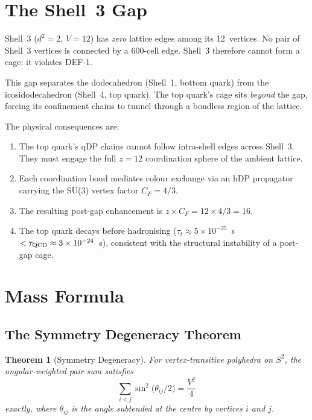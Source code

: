 \documentclass[11pt,letterpaper]{article}
\newtheorem{theorem}{Theorem}[section]
\begin{document}
\section{The Shell~3 Gap}
\label{sec:shell3}

Shell~3 ($d^2 = 2$, $V = 12$) has \emph{zero} lattice edges among
its 12~vertices.  No pair of Shell~3 vertices is connected by a
600-cell edge.  Shell~3 therefore cannot form a cage: it violates
DEF-1.

This gap separates the dodecahedron (Shell~1, bottom quark) from
the icosidodecahedron (Shell~4, top quark).  The top quark's cage
sits \emph{beyond} the gap, forcing its confinement chains to
tunnel through a bondless region of the lattice.

The physical consequences are:
\begin{enumerate}
\item The top quark's qDP chains cannot follow intra-shell edges
  across Shell~3.  They must engage the full $z\!=\!12$
  coordination sphere of the ambient lattice.
\item Each coordination bond mediates colour exchange via an hDP
  propagator carrying the SU(3) vertex factor $C_F = 4/3$.
\item The resulting post-gap enhancement is $z \times C_F =
  12 \times 4/3 = 16$.
\item The top quark decays before hadronising ($\tau_t \approx
  5 \times 10^{-25}$~s $< \tau_{\rm QCD} \approx 3 \times
  10^{-24}$~s), consistent with the structural instability of a
  post-gap cage.
\end{enumerate}

\section{Mass Formula}
\label{sec:mass}

\subsection{The Symmetry Degeneracy Theorem}

\begin{theorem}[Symmetry Degeneracy]
\label{thm:degeneracy}
For vertex-transitive polyhedra on $S^2$, the angular-weighted
pair sum satisfies
\[
  \sum_{i < j} \sin^2\!\bigl(\theta_{ij}/2\bigr) = \frac{V^2}{4}
\]
exactly, where $\theta_{ij}$ is the angle subtended at the centre
by vertices $i$ and $j$.
\end{theorem}
\end{document}
